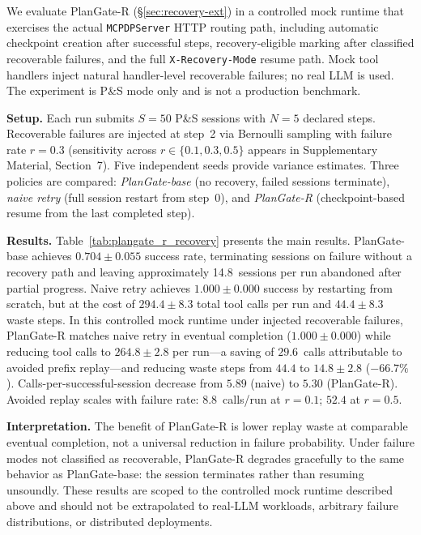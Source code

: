 \documentclass[sigconf,review,anonymous]{acmart}
\begin{document}
We evaluate PlanGate-R (\S\ref{sec:recovery-ext}) in a controlled mock runtime that exercises the actual \texttt{MCPDPServer} HTTP routing path, including automatic checkpoint creation after successful steps, recovery-eligible marking after classified recoverable failures, and the full \texttt{X-Recovery-Mode} resume path.
Mock tool handlers inject natural handler-level recoverable failures; no real LLM is used.
The experiment is P\&S mode only and is not a production benchmark.

\textbf{Setup.}
Each run submits $S{=}50$ P\&S sessions with $N{=}5$ declared steps.
Recoverable failures are injected at step~2 via Bernoulli sampling with failure rate $r{=}0.3$ (sensitivity across $r\in\{0.1,0.3,0.5\}$ appears in Supplementary Material, Section~7).
Five independent seeds provide variance estimates.
Three policies are compared:
\emph{PlanGate-base} (no recovery, failed sessions terminate),
\emph{naive retry} (full session restart from step~0), and
\emph{PlanGate-R} (checkpoint-based resume from the last completed step).

\textbf{Results.}
Table~\ref{tab:plangate_r_recovery} presents the main results.
PlanGate-base achieves $0.704\pm0.055$ success rate, terminating sessions on failure without a recovery path and leaving approximately 14.8~sessions per run abandoned after partial progress.
Naive retry achieves $1.000\pm0.000$ success by restarting from scratch, but at the cost of $294.4\pm8.3$ total tool calls per run and $44.4\pm8.3$ waste steps.
In this controlled mock runtime under injected recoverable failures, PlanGate-R matches naive retry in eventual completion ($1.000\pm0.000$) while reducing tool calls to $264.8\pm2.8$ per run---a saving of $29.6$~calls attributable to avoided prefix replay---and reducing waste steps from $44.4$ to $14.8\pm2.8$ ($-66.7\%$).
Calls-per-successful-session decrease from $5.89$ (naive) to $5.30$ (PlanGate-R).
Avoided replay scales with failure rate: $8.8$~calls/run at $r{=}0.1$; $52.4$ at $r{=}0.5$.

\textbf{Interpretation.}
The benefit of PlanGate-R is lower replay waste at comparable eventual completion, not a universal reduction in failure probability.
Under failure modes not classified as recoverable, PlanGate-R degrades gracefully to the same behavior as PlanGate-base: the session terminates rather than resuming unsoundly.
These results are scoped to the controlled mock runtime described above and should not be extrapolated to real-LLM workloads, arbitrary failure distributions, or distributed deployments.
\end{document}
